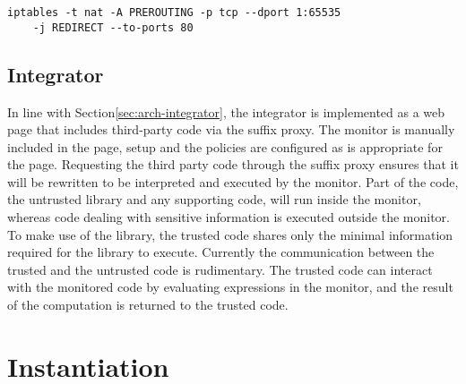 \documentclass{llncs}
\begin{document}
\begin{lstlisting}[language=langsmall,label=lst:iptables, caption=Example of redirecting ports using iptables]
iptables -t nat -A PREROUTING -p tcp --dport 1:65535 
	-j REDIRECT --to-ports 80
\end{lstlisting}

\subsection{Integrator}


In line with Section\ref{sec:arch-integrator}, the integrator is implemented as 
a web page that includes third-party code via the suffix proxy. The monitor is 
manually included in the page, setup and the policies are configured as is 
appropriate for the page. Requesting the third party code through the suffix 
proxy ensures that it will be rewritten to be interpreted and executed by the 
monitor.
%
Part of the code, the untrusted library and any supporting code,
will run inside the monitor, whereas code dealing with sensitive 
information is executed outside the monitor. To make use of the library, 
the trusted code shares only the minimal information required for the 
library to execute. Currently the communication between the trusted and the 
untrusted code is rudimentary. The trusted code can interact with the monitored 
code by evaluating expressions in the monitor, and the result of the computation
is returned to the trusted code.






\section{Instantiation}
\label{sec:case}
\end{document}
